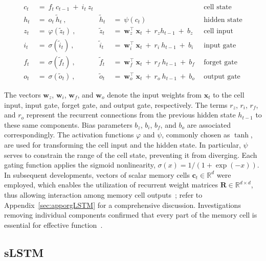\begin{align}
c_t \ &= \  f_t \ c_{t-1} \ + \ i_t \ z_t &  & &\text{cell state} \\
h_t  \ &= \ o_t \ \tilde{h}_t \ , & \tilde{h}_t \ &= \ \psi \left( c_t\right)
  &\text{hidden state} \\
z_t \ &= \ \varphi \left( \tilde{z}_t \right) \ , 
  &\tilde{z}_t \ &=  \ \mathbf{w}^\top_{z} \ \mathbf{x}_t \ + \
  r_{z}  h_{t-1} \ + \  b_{z} \ \
  &\text{cell input} \\
i_t \ &= \ \sigma \left( \tilde{i}_t  \right) \ , 
  &\tilde{i}_t \ &= \ \mathbf{w}^\top_{i} \ \mathbf{x}_t \ + \
  r_{i}  \ h_{t-1} \ + \  b_{i} \ \
  &\text{input gate} \\
f_t \ &= \ \sigma \left(  \tilde{f}_t \right) \ , 
  &\tilde{f}_t \ &= \ \mathbf{w}^\top_{f} \ \mathbf{x}_t  \ + \
  r_{f}  \ h_{t-1} \ + \  b_{f} \ \
  &\text{forget gate} \\
o_t \ &= \ \sigma \left( \tilde{o}_t \right) \ , 
  &\tilde{o}_t  \ &= \ \mathbf{w}^\top_{o} \ \mathbf{x}_t \ + \
  r_{o}  \ h_{t-1} \ + \  b_{o} \ \
  &\text{output gate} 
\end{align}

The vectors $\mathbf{w}_{z}$, $\mathbf{w}_{i}$, $\mathbf{w}_{f}$, and $\mathbf{w}_{o}$ denote the input weights from $\mathbf{x}_t$ to the cell input, input gate, forget gate, and output gate, respectively. The terms $r_{z}$, $r_{i}$, $r_{f}$, and $r_{o}$ represent the recurrent connections from the previous hidden state $h_{t-1}$ to these same components. Bias parameters $b_{z}$, $b_{i}$, $b_{f}$, and $b_{o}$ are associated correspondingly. The activation functions $\varphi$ and $\psi$, commonly chosen as $\tanh$, are used for transforming the cell input and the hidden state. In particular, $\psi$ serves to constrain the range of the cell state, preventing it from diverging. Each gating function applies the sigmoid nonlinearity, $\sigma \left( x \right)= 1/(1+\exp(-x))$. In subsequent developments, vectors of scalar memory cells $\mathbf{c}_t \in \mathbb{R}^{d}$ were employed, which enables the utilization of recurrent weight matrices $\mathbf{R} \in \mathbb{R}^{d \times d}$, thus allowing interaction among memory cell outputs~\citep{Greff:15}; refer to Appendix~\ref{sec:apporgLSTM} for a comprehensive discussion. Investigations removing individual components confirmed that every part of the memory cell is essential for effective function~\citep{Greff:15}.

\subsection{sLSTM}
\label{sec:sLSTM}

